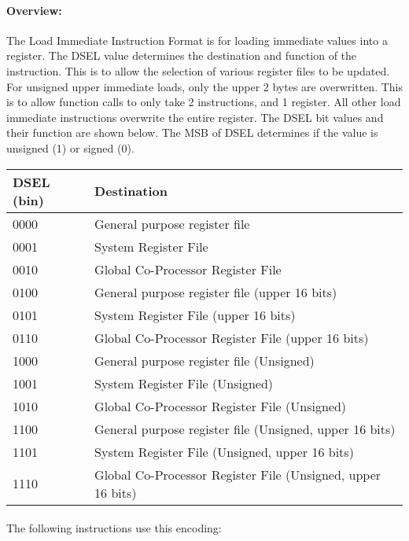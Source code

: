 \documentclass[letterpaper, 11pt]{article}
\begin{document}
\paragraph{Overview:}The Load Immediate Instruction Format is for loading immediate values into a register.
The DSEL value determines the destination and function of the instruction. This is to allow the selection
of various register files to be updated. For unsigned upper immediate loads, only the upper 2 bytes are
overwritten. This is to allow function calls to only take 2 instructions, and 1 register. All other
load immediate instructions overwrite the entire register. The DSEL bit values and their function are shown below. 
The MSB of DSEL determines if the value is unsigned (1) or signed (0). \\
\begin{tabular}{l|l}
		DSEL (bin) & Destination \\ \hline
		0000 & General purpose register file \\
		0001 & System Register File \\
		0010 & Global Co-Processor Register File \\ 
		0100 & General purpose register file (upper 16 bits) \\
		0101 & System Register File (upper 16 bits)\\
		0110 & Global Co-Processor Register File (upper 16 bits)\\ 
		1000 & General purpose register file  (Unsigned)\\
		1001 & System Register File (Unsigned)\\
		1010 & Global Co-Processor Register File (Unsigned)\\ 
		1100 & General purpose register file  (Unsigned, upper 16 bits)\\
		1101 & System Register File (Unsigned, upper 16 bits)\\
		1110 & Global Co-Processor Register File (Unsigned, upper 16 bits)\\ 
		
		\end{tabular}

\paragraph{}The following instructions use this encoding: \\
\end{document}

